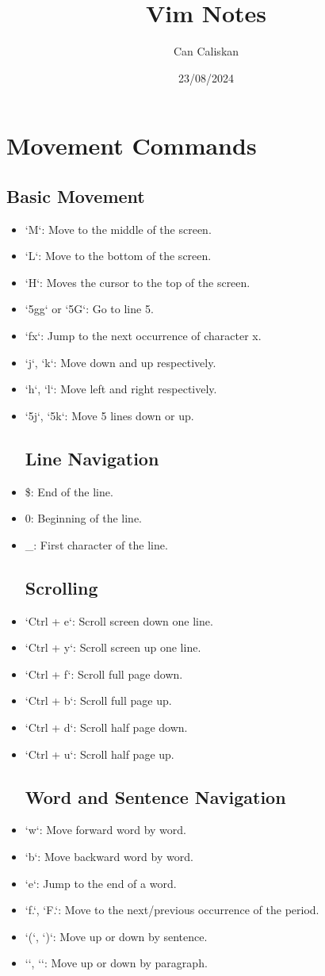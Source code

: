 \documentclass{report}
\title{ Vim Notes \\}
\date{23/08/2024}
\author{Can Caliskan}
\begin{document}
  \maketitle
  \raggedright %
\tableofcontents %
\newpage
\section{Movement Commands}
\subsection{Basic Movement}
\begin{itemize}
\item `M`: Move to the middle of the screen.
\item `L`: Move to the bottom of the screen.
\item  `H`: Moves the cursor to the top of the screen.
\item `5gg` or `5G`: Go to line 5.
\item `fx`: Jump to the next occurrence of character x.
\item `j`, `k`: Move down and up respectively.
\item `h`, `l`: Move left and right respectively.
\item `5j`, `5k`: Move 5 lines down or up.
	\subsection{Line Navigation}
\item \$: End of the line.
\item 0: Beginning of the line.
\item \_: First character of the line.
	\subsection{Scrolling}
\item `Ctrl + e`: Scroll screen down one line.
\item `Ctrl + y`: Scroll screen up one line.
\item `Ctrl + f`: Scroll full page down.
\item `Ctrl + b`: Scroll full page up.
\item `Ctrl + d`: Scroll half page down.
\item `Ctrl + u`: Scroll half page up.

	\subsection{Word and Sentence Navigation}
\item `w`: Move forward word by word.
\item `b`: Move backward word by word.
\item `e`: Jump to the end of a word.
\item `f.`, `F.`: Move to the next/previous occurrence of the period.
\item `(`, `)`: Move up or down by sentence.
\item `{`, `}`: Move up or down by paragraph.

\end{itemize}
\end{document}
